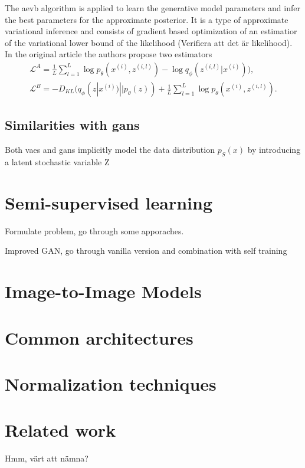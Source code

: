 The \acrshort{aevb} algorithm is applied to learn the generative model parameters and infer the best parameters for the approximate posterior. It is a type of approximate variational inference and consists of gradient based optimization of an estimatior of the variational lower bound of the likelihood (Verifiera att det är likelihood). In the original article the authors propose two estimators
\begin{equation}
    \begin{aligned}
        \mathcal{L}^A = \frac{1}{L}\sum_{l=1}^L \log p_\theta (x^{(i)},z^{(i, l)}) - \log q_\phi (z^{(i, l)} | x^{(i)}) ), \\
        \mathcal{L}^B = - D_{KL}(q_\phi (z | x^{(i)}) || p_\theta(z)) + \frac{1}{L}\sum_{l=1}^L \log p_\theta (x^{(i)},z^{(i, l)}).
    \end{aligned}
\end{equation}


\subsection{Similarities with \acrshort{gans}}
Both \acrshort{vaes} and \acrshort{gans} implicitly model the data distribution $p_S(x)$ by introducing a latent stochastic variable Z


\section{Semi-supervised learning}
Formulate problem, go through some apporaches.

Improved GAN, go through vanilla version and combination with self training \cite{wuliu2017selftrainsemisup}

\section{Image-to-Image Models}

\section{Common architectures}

\section{Normalization techniques}

\section{Related work}
Hmm, värt att nämna? 






